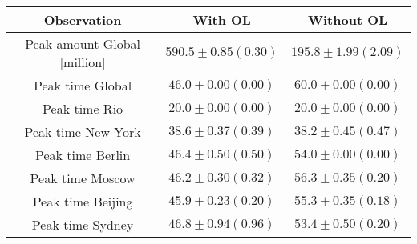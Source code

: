\begin{tabular}[H]{c | c | c}
Observation & With OL & Without OL \\ \hline 
 Peak amount Global [million]& $590.5\pm 0.85 (0.30)$ & $195.8 \pm 1.99 (2.09)$\\ 
 Peak time Global & $46.0\pm 0.00( 0.00)$ & $60.0 \pm 0.00 (0.00)$\\ 
 Peak time Rio & $20.0\pm 0.00( 0.00)$ & $20.0 \pm 0.00 (0.00)$\\ 
 Peak time New York & $38.6\pm 0.37( 0.39)$ & $38.2 \pm 0.45 (0.47)$\\ 
 Peak time Berlin & $46.4\pm 0.50( 0.50)$ & $54.0 \pm 0.00 (0.00)$\\ 
 Peak time Moscow & $46.2\pm 0.30( 0.32)$ & $56.3 \pm 0.35 (0.20)$\\ 
 Peak time Beijing & $45.9\pm 0.23( 0.20)$ & $55.3 \pm 0.35 (0.18)$\\ 
 Peak time Sydney & $46.8\pm 0.94( 0.96)$ & $53.4 \pm 0.50 (0.20)$
\end{tabular}